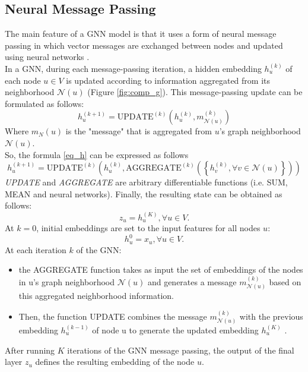 \subsection{Neural Message Passing}
The main feature of a GNN model is that it uses a form of neural message passing in which vector messages are exchanged between nodes and updated using neural networks \cite{gnn}.\\
In a GNN, during each message-passing iteration, a hidden embedding $h_u^{(k)}$ of each node $u \in V$ is updated according to information aggregated from its neighborhood $\mathcal{N}(u)$ (Figure \ref{fig:comp_g}). This message-passing update can be formulated as follows:
\begin{equation}\label{eq_h}
h^{(k+1)}_u = \text{UPDATE}^{(k)}\left(h^{(k)}_u, m^{(k)}_{\mathcal{N}(u)}\right)
\end{equation}
Where $m_N(u)$ is the "message" that is aggregated from $u$'s graph neighborhood $\mathcal{N}(u)$.\\
So, the formula \ref{eq_h} can be expressed as follows
\begin{equation}
h^{(k+1)}_u = \text{UPDATE}^{(k)}\left(h^{(k)}_u, \text{AGGREGATE}^{(k)}\left(\left\{h^{(k)}_v, \forall v \in \mathcal{N}(u)\right\}\right)\right)
\end{equation}
\textit{UPDATE} and \textit{AGGREGATE} are arbitrary differentiable functions (i.e. SUM, MEAN and neural networks). Finally, the resulting state can be obtained as follows:
\begin{equation}
z_u = h^{(K)}_u, \forall u \in V.
\end{equation}
At $k = 0$, initial embeddings are set to the input features for all nodes $u$: 
\begin{equation}
h^{0}_u = x_u, \forall u \in V. 
\end{equation}
At each iteration $k$ of the GNN:
\begin{itemize}
    \item the AGGREGATE function takes as input the set of embeddings of the nodes in u’s graph neighborhood ${\mathcal{N}(u)}$ and generates a message $m^{(k)}_{\mathcal{N}(u)}$ based on this aggregated neighborhood information.
    \item Then, the function UPDATE combines the message $m^{(k)}_{\mathcal{N}(u)}$ with the previous embedding $h^{(k-1)}_u$ of node u to generate the updated embedding $h^{(K)}_u$ .
\end{itemize}


After running $K$ iterations of the GNN message passing, the output of the final layer $z_u$ defines the resulting embedding of the node $u$.

